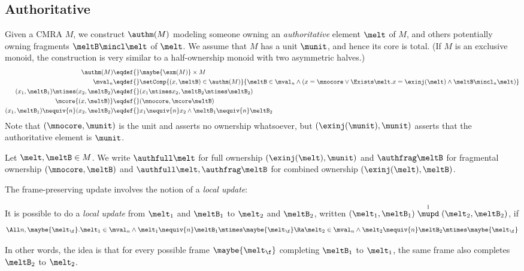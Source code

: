 \subsection{Authoritative}
\label{sec:auth-cmra}

Given a CMRA $M$, we construct $\authm(M)$ modeling someone owning an \emph{authoritative} element $\melt$ of $M$, and others potentially owning fragments $\meltB \mincl \melt$ of $\melt$.
We assume that $M$ has a unit $\munit$, and hence its core is total.
(If $M$ is an exclusive monoid, the construction is very similar to a half-ownership monoid with two asymmetric halves.)
\begin{align*}
\authm(M) \eqdef{}& \maybe{\exm(M)} \times M \\
\mval_n \eqdef{}& \setComp{ (x, \meltB) \in \authm(M) }{ \meltB \in \mval_n \land (x = \mnocore \lor \Exists \melt. x = \exinj(\melt) \land \meltB \mincl_n \melt) } \\
  (x_1, \meltB_1) \mtimes (x_2, \meltB_2) \eqdef{}& (x_1 \mtimes x_2, \meltB_2 \mtimes \meltB_2) \\
  \mcore{(x, \meltB)} \eqdef{}& (\mnocore, \mcore\meltB) \\
  (x_1, \meltB_1) \nequiv{n} (x_2, \meltB_2) \eqdef{}& x_1 \nequiv{n} x_2 \land \meltB_1 \nequiv{n} \meltB_2
\end{align*}
Note that $(\mnocore, \munit)$ is the unit and asserts no ownership whatsoever, but $(\exinj(\munit), \munit)$ asserts that the authoritative element is $\munit$.

Let $\melt, \meltB \in M$.
We write $\authfull \melt$ for full ownership $(\exinj(\melt), \munit)$ and $\authfrag \meltB$ for fragmental ownership $(\mnocore, \meltB)$ and $\authfull \melt , \authfrag \meltB$ for combined ownership $(\exinj(\melt), \meltB)$.

The frame-preserving update involves the notion of a \emph{local update}:
\newcommand\lupd{\stackrel{\mathrm l}{\mupd}}
\begin{defn}
  It is possible to do a \emph{local update} from $\melt_1$ and $\meltB_1$ to $\melt_2$ and $\meltB_2$, written $(\melt_1, \meltB_1) \lupd (\melt_2, \meltB_2)$, if
  \[ \All n, \maybe{\melt_\f}. \melt_1 \in \mval_n \land \melt_1 \nequiv{n} \meltB_1 \mtimes \maybe{\melt_\f} \Ra \melt_2 \in \mval_n \land \melt_2 \nequiv{n} \meltB_2 \mtimes \maybe{\melt_\f} \]
\end{defn}
In other words, the idea is that for every possible frame $\maybe{\melt_\f}$ completing $\meltB_1$ to $\melt_1$, the same frame also completes $\meltB_2$ to $\melt_2$.

